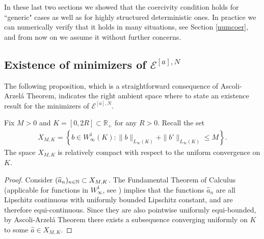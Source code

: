 In these last two sections we showed that the coercivity condition holds for ``generic" cases as well as for highly structured deterministic ones. In practice we can numerically verify that it holds in many situations, see Section \ref{numcoer}, and from now on we assume it without further concerns. 




\subsection{Existence of minimizers of $\mathcal E^{[a],N}$}
The following proposition, which is a straightforward consequence of Ascoli-Arzel\'a Theorem, indicates the right ambient space where to state an existence result for the minimizers of $\mathcal E^{[a],N}$.

\begin{proposition}\label{XMdef}
Fix $M > 0$ and $K=[0,2R] \subset  \mathbb R_+$ for any $R>0$. Recall the set
\begin{align*}
X_{M,K} = \left\{b \in W^{1}_{\infty}(K) :
 \|b\|_{L_{\infty}(K)} + \|b'\|_{L_{\infty}(K)} \leq M
 \right\}.
\end{align*}
The space $X_{M,K}$ is relatively compact with respect to the uniform convergence on $K$.
\end{proposition}
\begin{proof}
Consider $(\widehat a_n)_{n \in \mathbb{N}} \subset X_{M,K}$. The Fundamental Theorem of Calculus (applicable for functions in $W^{1}_{\infty}$, see \cite[Theorem 2.8]{AFP00}) 
implies that the functions $\widehat a_n$ are all Lipschitz continuous with uniformly bounded Lipschitz constant, and are therefore equi-continuous. Since they are also pointwise uniformly equi-bounded,
by Ascoli-Arzel\'a Theorem there exists a subsequence converging uniformly on $K$ to some $\widehat a \in X_{M,K}$.
\end{proof}

